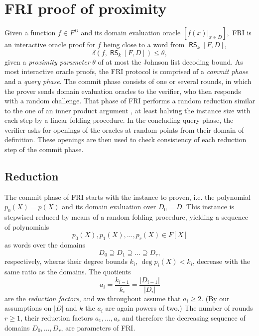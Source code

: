 \documentclass[11pt,article,oneside]{memoir}
\theoremstyle{definition}
\theoremstyle{remark}
\DeclareMathOperator{\RS}{\mathsf{RS}}
\begin{document}
\chapter{FRI proof of proximity}

Given a function $f\in F^D$ and its  domain evaluation oracle 
$
[f(x)|_{x\in D}],
$ 
FRI is an interactive oracle proof for $f$ being close to a word from $\RS_k[F,D]$, 
\[
\delta( f, \RS_k[F,D]) \leq \theta,
\]
given a \textit{proximity parameter} $\theta$ of at most the Johnson list decoding bound. %
%
As most interactive oracle proofs, the FRI protocol is comprised of a \textit{commit phase} and a \textit{query phase}.
The commit phase consists of one or several rounds, in which the prover sends domain evaluation oracles to the verifier, who then responds with a random challenge.
That phase of FRI performs a random reduction similar to the one of an inner product argument \cite{BootleGroth}, at least halving the instance size with each step by a linear folding procedure.
In the concluding query phase, the verifier asks for openings of the oracles at random points from their domain of definition. 
These openings are then used to check consistency of each reduction step of the commit phase.


\section{Reduction}


The commit phase of FRI starts with the instance to proven, i.e. the polynomial $p_0(X)=p(X)$ and its domain evaluation over $D_0=D$.
This instance is stepwised reduced by means of a random folding procedure, yielding a sequence of polynomials 
\[
p_0(X), p_1(X), \ldots , p_r(X)\in  F[X]
\]
as words over the domains 
\[
D_0\supseteq D_1\supseteq \ldots\supseteq D_r,
\]
respectively, wheras their degree bounds $k_i$, $\deg p_i(X) < k_i$, decrease with the same ratio as the domains.
The quotients 
\[
a_i = \frac{k_{i-1}}{k_i} = \frac{|D_{i-1}|}{|D_i|} 
\]
are the \textit{reduction factors}, and we throughout assume that $a_i\geq 2$. (By our assumptions on $|D|$ and $k$ the $a_i$ are again powers of two.)
The number of rounds $r\geq 1$,  their reduction factors $a_1,\ldots, a_r$ and therefore the decreasing sequence of domains $D_0,\ldots, D_r$, are parameters of FRI.
\end{document}
